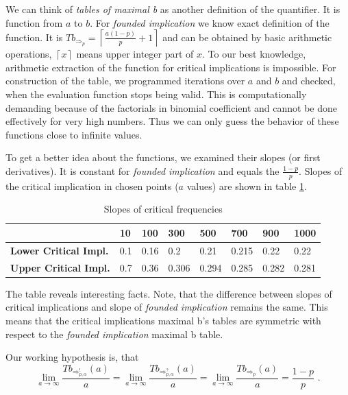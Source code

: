 We can think of \emph{tables of maximal b} as another definition of the quantifier. It is function from $a$ to $b$. For \emph{founded implication} we know exact definition of the function. It is 
%
%
%
$ Tb_{\Rightarrow_{p}} = \left\lceil \frac{a(1-p)}{p} + 1 \right\rceil$
%
and can be obtained by basic arithmetic operations, $ \left\lceil x \right\rceil$ means upper integer part of $x$. 
To our best knowledge, arithmetic extraction of the function for critical implications is impossible. For construction of the table, we programmed iterations over $a$ and $b$ and checked, when the evaluation function stops being valid. This is computationally demanding because of the factorials in binomial coefficient and cannot be done effectively for very high numbers. Thus we can only guess the behavior of these functions close to infinite values. 

To get a better idea about the functions, we examined their slopes (or first derivatives). It is constant for \emph{founded implication} and equals the $\frac{1-p}{p}$. Slopes of the critical implication in chosen points ($a$ values) are shown in table \ref{tab:slopes}.

\begin{table}[ht]
	\centering
		\begin{tabular}{|p{4cm}|p{1cm}|p{1cm}|p{1cm}|p{1cm}|p{1cm}|p{1cm}|p{1cm}|}
			\hline
			&\textbf{10}&\textbf{100}&\textbf{300}&\textbf{500}&\textbf{700}&\textbf{900}&\textbf{1000}\\
			\hline
			\textbf{Lower Critical Impl.}&0.1&0.16&0.2&0.21&0.215&0.22&0.22\\
			\hline
			\textbf{Upper Critical Impl.}&0.7&0.36&0.306&0.294&0.285&0.282&0.281\\
			\hline
		\end{tabular}
	\caption{Slopes of critical frequencies}
	\label{tab:slopes}
\end{table}

The table reveals interesting facts. Note, that the difference between slopes of critical implications and slope of \emph{founded implication} remains the same. This means that the critical implications maximal b's tables are symmetric with respect to the \emph{founded implication} maximal b table. 

Our working hypothesis is, that 
%
%
%
$$\lim_{a\rightarrow\infty} \frac{Tb_{\Rightarrow^{!}_{p, \alpha}}(a)}{a} = \lim_{a\rightarrow\infty} \frac{Tb_{\Rightarrow^{?}_{p, \alpha}}(a)}{a} = \lim_{a\rightarrow\infty} \frac{Tb_{\Rightarrow_{p}}(a)}{a} = %
\frac{1-p}{p} \mbox{ .}$$ 

